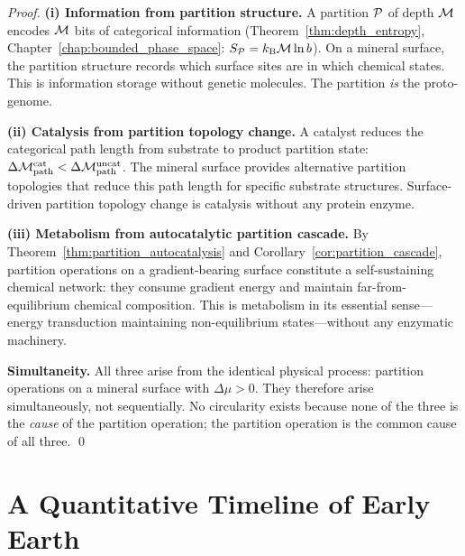 \begin{proof}
\noindent\textbf{(i) Information from partition structure.}
A partition $\mathcal{P}$ of depth $\mathcal{M}$ encodes $\mathcal{M}$ bits of categorical
information (Theorem~\ref{thm:depth_entropy}, Chapter~\ref{chap:bounded_phase_space}:
$S_{\mathcal{P}} = k_{\mathrm{B}} \mathcal{M} \ln b$). On a mineral surface, the partition structure
records which surface sites are in which chemical states. This is information
storage without genetic molecules. The partition \emph{is} the proto-genome.

\noindent\textbf{(ii) Catalysis from partition topology change.}
A catalyst reduces the categorical path length from substrate to product
partition state: $\Delta\mathcal{M}_{\mathrm{path}}^{\mathrm{cat}} < \Delta\mathcal{M}_{\mathrm{path}}^{\mathrm{uncat}}$.
The mineral surface provides alternative partition topologies that reduce this
path length for specific substrate structures. Surface-driven partition topology
change is catalysis without any protein enzyme.

\noindent\textbf{(iii) Metabolism from autocatalytic partition cascade.}
By Theorem~\ref{thm:partition_autocatalysis} and Corollary~\ref{cor:partition_cascade},
partition operations on a gradient-bearing surface constitute a self-sustaining
chemical network: they consume gradient energy and maintain far-from-equilibrium
chemical composition. This is metabolism in its essential sense---energy
transduction maintaining non-equilibrium states---without any enzymatic machinery.

\noindent\textbf{Simultaneity.} All three arise from the identical physical
process: partition operations on a mineral surface with $\Delta\mu > 0$. They
therefore arise simultaneously, not sequentially. No circularity exists because
none of the three is the \emph{cause} of the partition operation; the partition
operation is the common cause of all three. \qed
\end{proof}

\section{A Quantitative Timeline of Early Earth}
\label{sec:early_earth_timeline}

